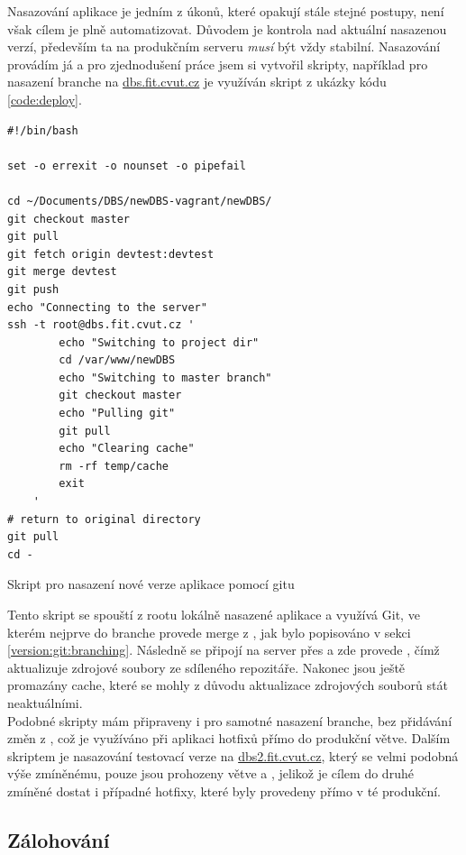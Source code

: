 Nasazování aplikace je jedním z úkonů, které opakují stále stejné postupy, není však cílem je plně automatizovat. Důvodem je kontrola nad aktuální nasazenou verzí, především ta na produkčním serveru \emph{musí} být vždy stabilní. Nasazování provádím já a pro zjednodušení práce jsem si vytvořil skripty, například pro nasazení  branche na \url{dbs.fit.cvut.cz} je využíván skript z ukázky kódu \ref{code:deploy}.
\begin{listing}
	\begin{verbatim}
#!/bin/bash

set -o errexit -o nounset -o pipefail

cd ~/Documents/DBS/newDBS-vagrant/newDBS/
git checkout master
git pull
git fetch origin devtest:devtest
git merge devtest
git push
echo "Connecting to the server"
ssh -t root@dbs.fit.cvut.cz '
        echo "Switching to project dir"
        cd /var/www/newDBS
        echo "Switching to master branch"
        git checkout master
        echo "Pulling git"
        git pull
        echo "Clearing cache"
        rm -rf temp/cache
        exit
    '
# return to original directory
git pull
cd -
	\end{verbatim}
	\caption{Skript pro nasazení nové verze aplikace pomocí gitu} \label{code:deploy}
\end{listing}
Tento skript se spouští z rootu lokálně nasazené aplikace a využívá Git, ve kterém nejprve do  branche provede merge z , jak bylo popisováno v sekci \ref{version:git:branching}. Následně se připojí na server přes  a zde provede , čímž aktualizuje zdrojové soubory ze sdíleného repozitáře. Nakonec jsou ještě promazány cache, které se mohly z důvodu aktualizace zdrojových souborů stát neaktuálními.\\
Podobné skripty mám připraveny i pro samotné nasazení  branche, bez přidávání změn z , což je využíváno při aplikaci hotfixů přímo do produkční větve. Dalším skriptem je nasazování testovací verze na \url{dbs2.fit.cvut.cz}, který se velmi podobná výše zmíněnému, pouze jsou prohozeny větve  a , jelikož je cílem do druhé zmíněné dostat i případné hotfixy, které byly provedeny přímo v té produkční.

\subsection{Zálohování}


